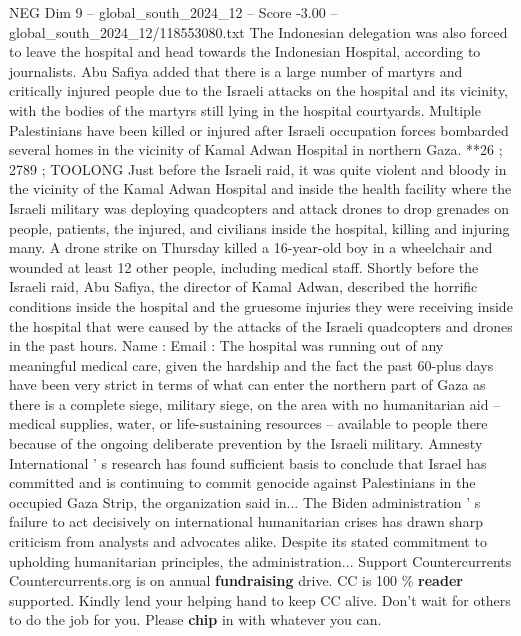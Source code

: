 \begin{textsample}{NEG Dim 9 – global\_south\_2024\_12 – Score -3.00 – global\_south\_2024\_12/118553080.txt}
The Indonesian delegation was also forced to leave the hospital and head towards the Indonesian Hospital, according to journalists.
Abu Safiya added that there is a large number of martyrs and critically injured people due to the Israeli attacks on the hospital and its vicinity, with the bodies of the martyrs still lying in the hospital courtyards.
Multiple Palestinians have been killed or injured after Israeli occupation forces bombarded several homes in the vicinity of Kamal Adwan Hospital in northern Gaza. **26 ; 2789 ; TOOLONG Just before the Israeli raid, it was quite violent and bloody in the vicinity of the Kamal Adwan Hospital and inside the health facility where the Israeli military was deploying quadcopters and attack drones to drop grenades on people, patients, the injured, and civilians inside the hospital, killing and injuring many.
A drone strike on Thursday killed a 16-year-old boy in a wheelchair and wounded at least 12 other people, including medical staff.
Shortly before the Israeli raid, Abu Safiya, the director of Kamal Adwan, described the horrific conditions inside the hospital and the gruesome injuries they were receiving inside the hospital that were caused by the attacks of the Israeli quadcopters and drones in the past hours.
Name : Email : The hospital was running out of any meaningful medical care, given the hardship and the fact the past 60-plus days have been very strict in terms of what can enter the northern part of Gaza as there is a complete siege, military siege, on the area with no humanitarian aid -- medical supplies, water, or life-sustaining resources -- available to people there because of the ongoing deliberate prevention by the Israeli military.
Amnesty International ' s research has found sufficient basis to conclude that Israel has committed and is continuing to commit genocide against Palestinians in the occupied Gaza Strip, the organization said in...
The Biden administration ' s failure to act decisively on international humanitarian crises has drawn sharp criticism from analysts and advocates alike.
Despite its stated commitment to upholding humanitarian principles, the administration...
Support Countercurrents Countercurrents.org is on annual \textbf{fundraising} drive.
CC is 100 \% \textbf{reader} supported.
Kindly lend your helping hand to keep CC alive.
Don't wait for others to do the job for you.
Please \textbf{chip} in with whatever you can.

\end{textsample}
